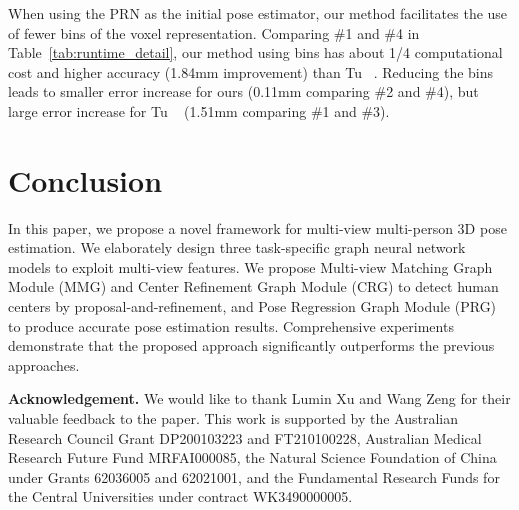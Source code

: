 \documentclass[10pt,twocolumn,letterpaper]{article}
\begin{document}
When using the PRN as the initial pose estimator, our method facilitates the use of fewer bins of the voxel representation. Comparing \#1 and \#4 in Table~\ref{tab:runtime_detail}, our method using  bins has about 1/4 computational cost and higher accuracy (1.84mm improvement) than Tu \etal ~\cite{tu2020voxelpose}. Reducing the bins leads to smaller error increase for ours (0.11mm comparing \#2 and \#4), but large error increase for Tu \etal ~\cite{tu2020voxelpose} (1.51mm comparing \#1 and \#3).

\begin{table}[h]
    \centering
    \caption{Runtime comparison.  is the number of persons. `avg is the average runtime (ms) when . `\#bins' is the number of bins (voxel granularity) for PRN. }
    \label{tab:runtime_detail}
\end{table}

\section{Conclusion}

In this paper, we propose a novel framework for multi-view multi-person 3D pose estimation. We elaborately design three task-specific graph neural network models to exploit multi-view features. We propose Multi-view Matching Graph Module (MMG) and Center Refinement Graph Module (CRG) to detect human centers by proposal-and-refinement, and Pose Regression Graph Module (PRG) to produce accurate pose estimation results. Comprehensive experiments demonstrate that the proposed approach significantly outperforms the previous approaches.


\textbf{Acknowledgement.} We would like to thank Lumin Xu and Wang Zeng for their valuable feedback to the paper. This work is supported by the Australian Research Council Grant DP200103223 and FT210100228, Australian Medical Research Future Fund MRFAI000085, the Natural Science Foundation of China under Grants 62036005 and 62021001, and the Fundamental Research Funds for the Central Universities under contract WK3490000005.
\end{document}
